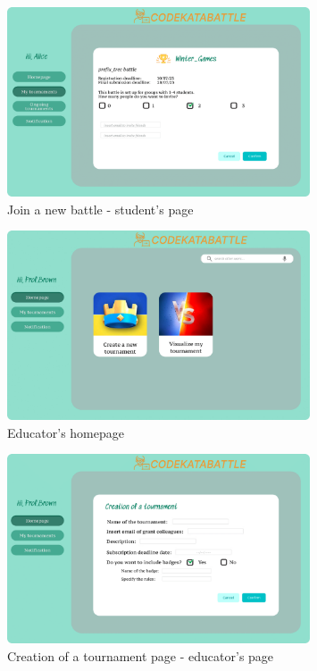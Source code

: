 \begin{figure}[H]
    \centering
    \includegraphics[width=0.8\textwidth]{images/user_interface/UI_sw2-09.png}
    \caption{Join a new battle - student's page}
\end{figure}

\begin{figure}[H]
    \centering
    \includegraphics[width=0.8\textwidth]{images/user_interface/UI_sw2-10.png}
    \caption{Educator's homepage}
\end{figure}

\begin{figure}[H]
    \centering
    \includegraphics[width=0.8\textwidth]{images/user_interface/UI_sw2-11.png}
    \caption{Creation of a tournament page - educator's page}
\end{figure}

